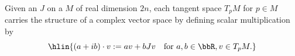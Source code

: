 \begin{definition} \label{definition:almost_complex_structure_on_a_smooth_manifold_of_even_real_dimension_induces_complex_vector_space_structure_on_each_tangent_space}
    Given an  $J$ on a  $M$ of real dimension $2n$, each tangent space $T_p M$ for $p \in M$ carries the structure of a complex vector space by defining scalar multiplication by 
    $$\hlin{(a+ib) \cdot v := av + bJv \quad \text{for } a,b \in \bbR, v \in T_p M.}$$
\end{definition}